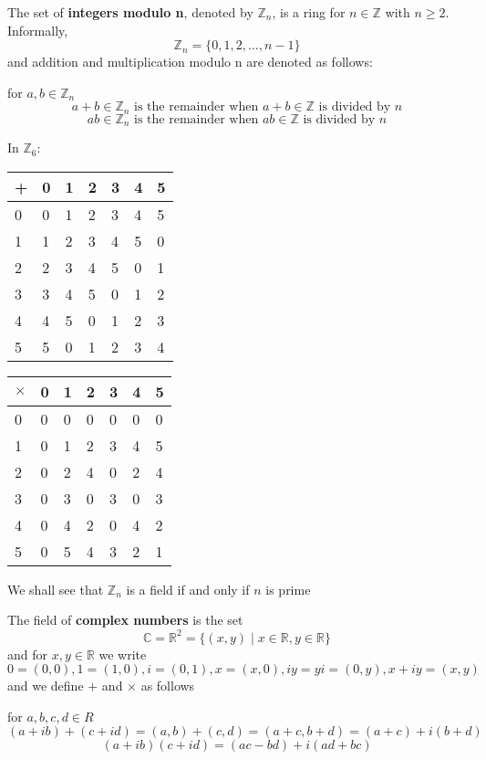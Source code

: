 \begin{exmp}
The set of \textbf{integers modulo n}, denoted by $\mathbb{Z}_n$, is a ring for $n\in \mathbb{Z}$ with $n\geq 2$. Informally,
\[\mathbb{Z}_n = \{0,1,2,\dots,n-1\}\]
and addition and multiplication modulo n are denoted as follows:

for $a,b\in\mathbb{Z}_n$ \[a+b \in \mathbb{Z}_n \text{ is the remainder when } a+b \in \mathbb{Z} \text{ is divided by }n\]
 \[ab \in \mathbb{Z}_n \text{ is the remainder when } ab \in \mathbb{Z} \text{ is divided by }n\]
 
In $\mathbb{Z}_6$:

\begin{center}
\begin{tabular}{l|l|l|l|l|l|l}
 + & 0 & 1 & 2 & 3 & 4 & 5 \\ \hline
 0 & 0 & 1 & 2 & 3 & 4 & 5 \\\hline
 1 & 1 & 2 & 3 & 4 & 5 & 0 \\\hline
 2 & 2 & 3 & 4 & 5 & 0 & 1 \\\hline
 3 & 3 & 4 & 5 & 0 & 1 & 2 \\\hline
 4 & 4 & 5 & 0 & 1 & 2 & 3 \\\hline
 5 & 5 & 0 & 1 & 2 & 3 & 4
\end{tabular}

\begin{tabular}{l|l|l|l|l|l|l}
 $\times$ & 0 & 1 & 2 & 3 & 4 & 5 \\\hline
 0 & 0 & 0 & 0 & 0 & 0 & 0 \\\hline
 1 & 0 & 1 & 2 & 3 & 4 & 5 \\\hline
 2 & 0 & 2 & 4 & 0 & 2 & 4 \\\hline
 3 & 0 & 3 & 0 & 3 & 0 & 3 \\\hline
 4 & 0 & 4 & 2 & 0 & 4 & 2 \\\hline
 5 & 0 & 5 & 4 & 3 & 2 & 1 \\
\end{tabular}

\end{center}
We shall see that $\mathbb{Z}_n$ is a field if and only if $n$ is prime
\end{exmp}

\begin{exmp}
The field of \textbf{complex numbers} is the set \[\mathbb{C} = \mathbb{R}^2 = \{(x,y)\mid x\in \mathbb{R},y\in\mathbb{R}\}\]
and for $x,y\in\mathbb{R}$ we write \[0 = (0,0), 1 = (1,0), i = (0,1), x = (x,0), iy = yi = (0,y), x+iy = (x,y)\]
and we define $+$ and $\times$ as follows

for $a,b,c,d\in R$ \[(a+ib)+(c+id) = (a,b)+(c,d) = (a+c,b+d) = (a+c) + i(b+d)\]
\[(a+ib)(c+id) = (ac-bd) + i(ad+bc)\]
\end{exmp}

